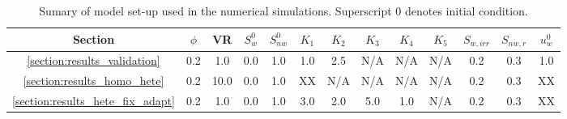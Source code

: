 
\begin{landscape}
\begin{table}
  \begin{tabular}{c | c c  c  c  c  c  c  c  c  c  c   c}
    \hline
      {\bf Section} & $\phi$ & VR  & $S^{0}_{w}$ & $S^{0}_{nw}$ & $K_{1}$ & $K_{2}$ & $K_{3}$ & $K_{4}$ & $K_{5}$ & $S_{w,irr}$ & $S_{nw,r}$ & $u^{0}_{w}$ \\ 
    \hline
      \ref{section:results_validation} & 0.2  & 1.0  & 0.0  & 1.0  & 1.0  & 2.5  & N/A  & N/A  & N/A & 0.2  & 0.3 & 1.0 \\
      \ref{section:results_homo_hete}  & 0.2  & 10.0 & 0.0  & 1.0  &  XX  & N/A  & N/A  & N/A  & N/A & 0.2  & 0.3 & XX  \\
      \ref{section:results_hete_fix_adapt}  & 0.2  & 1.0  & 0.0  & 1.0  &  3.0  & 2.0  & 5.0  & 1.0  & N/A & 0.2  & 0.3 & XX  \\
      \hline
   \end{tabular}
   \caption{Sumary of model set-up used in the numerical simulations. Superscript $0$ denotes initial condition. }\label{table:setup}
\end{table}
\end{landscape}
\clearpage






